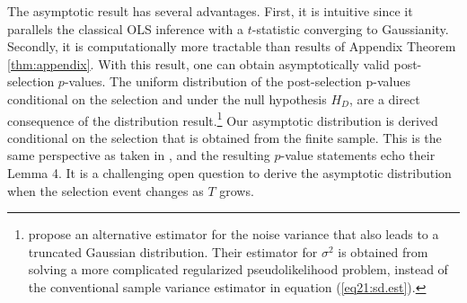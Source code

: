 \documentclass[11pt]{article}
\def\cmt#1{{\textcolor{red}{(#1)}}}
\begin{document}
The asymptotic result has several advantages. First, it is intuitive since it parallels the classical OLS inference with a $t$-statistic converging to Gaussianity. Secondly, it is computationally more tractable than results of Appendix Theorem \ref{thm:appendix}. With this result, one can obtain asymptotically valid post-selection $p$-values. The uniform distribution of the post-selection p-values conditional on the selection and under the null hypothesis $H_D$, are a direct consequence of the distribution result.\footnote{\cite{tian2017selective} propose an alternative estimator for the noise variance that also leads to a truncated Gaussian distribution. Their estimator for $\sigma^2$ is obtained from solving a more complicated regularized pseudolikelihood problem, instead of the conventional sample variance estimator in equation (\ref{eq21:sd.est}).} Our asymptotic distribution is derived conditional on the selection that is obtained from the finite sample. This is the same perspective as taken in \cite{tian2017asymptotics}, and the resulting $p$-value statements echo their Lemma 4. It is a challenging open question to derive the asymptotic distribution when the selection event changes as $T$ grows.    





\end{document}
